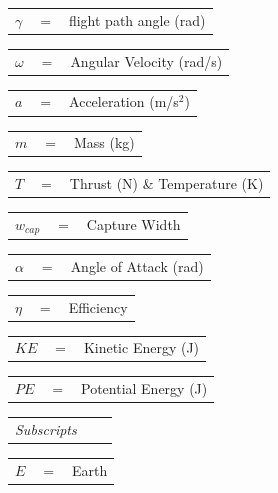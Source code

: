 \begin{tabular}{p{1.2cm}p{1cm}p{5cm}}
	$\gamma$ & $=$ & flight path angle (rad)\\
\end{tabular} 
\begin{tabular}{p{1.2cm}p{1cm}p{5cm}}
	$\omega$ & $=$ & Angular Velocity (rad/s)\\
\end{tabular} 
\begin{tabular}{p{1.2cm}p{1cm}p{5cm}}
	$a$ & $=$ & Acceleration (m/s$^2$)\\
\end{tabular} 
\begin{tabular}{p{1.2cm}p{1cm}p{5cm}}
	$m$ & $=$ & Mass (kg)\\
\end{tabular} 
\begin{tabular}{p{1.2cm}p{1cm}p{5cm}}
	$T$ & $=$ & Thrust (N) \& Temperature (K)\\
\end{tabular} 
\begin{tabular}{p{1.2cm}p{1cm}p{5cm}}
	$w_{cap}$ & $=$ & Capture Width\\
\end{tabular} 
\begin{tabular}{p{1.2cm}p{1cm}p{5cm}}
	$\alpha$ & $=$ & Angle of Attack (rad)\\
\end{tabular} 	
\begin{tabular}{p{1.2cm}p{1cm}p{5cm}}
	$\eta$ & $=$ & Efficiency\\
\end{tabular} 	
\begin{tabular}{p{1.2cm}p{1cm}p{5cm}}
	$KE$ & $=$ & Kinetic Energy (J)\\
\end{tabular} 
\begin{tabular}{p{1.2cm}p{1cm}p{5cm}}
	$PE$ & $=$ & Potential Energy (J)\\
\end{tabular} 
\newline  	
\begin{tabular}{p{5.2cm}p{1cm}p{5cm}}

	\textit{Subscripts} \\
\end{tabular} 
\newline
\begin{tabular}{p{1.2cm}p{1cm}p{5cm}}
	$E$ & $=$ & Earth\\
	
\end{tabular} 
